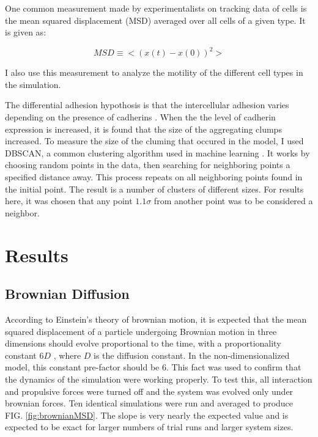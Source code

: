 \documentclass[aps,prb,twocolumn,groupedaddress,nofootinbib,floatfix]{revtex4}
\begin{document}
One common measurement made by experimentalists on tracking data of cells is the mean squared displacement (MSD) averaged over all cells of a given type.
It is given as:

\begin{equation}
  MSD \equiv <(x(t) - x(0))^2>
\end{equation}

I also use this measurement to analyze the motility of the different cell types in the simulation.

The differential adhesion hypothosis is that the intercellular adhesion varies depending on the presence of cadherins \cite{Foty}.
When the the level of cadherin expression is increased, it is found that the size of the aggregating clumps increased. 
To measure the size of the cluming that occured in the model, I used DBSCAN, a common clustering algorithm used in machine learning \cite{Ester}. 
It works by choosing random points in the data, then searching for neighboring points a specified distance away.
This process repeats on all neighboring points found in the initial point.
The result is a number of clusters of different sizes.
For results here, it was chosen that any point $1.1\sigma$ from another point was to be considered a neighbor.

\section{Results}


\subsection{Brownian Diffusion}
According to Einstein's theory of brownian motion, it is expected that the mean
squared displacement of a particle undergoing Brownian motion in three dimensions should evolve proportional to the time, with a proportionality constant $6 D$ \cite{}, where $D$ is the diffusion constant.
In the non-dimensionalized model, this constant pre-factor should be $6$. This fact was used to confirm that the dynamics of the simulation were working properly.
To test this, all interaction and propulsive forces were turned off and the system was evolved only under brownian forces.
Ten identical simulations were run and averaged to produce FIG. \ref{fig:brownianMSD}. The slope is very nearly the expected value and is expected to be exact for larger numbers of trial runs and larger system sizes.
\end{document}
